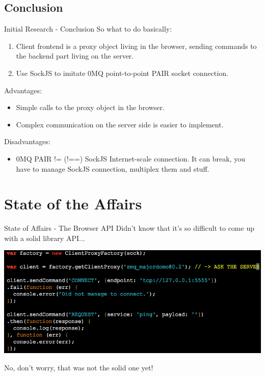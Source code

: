 \documentclass{beamer}
\begin{document}
\subsection{Conclusion}
\begin{frame}{Initial Research - Conclusion}
  So what to do basically:
  \begin{enumerate}
    \item Client frontend is a proxy object living in the browser,
	      sending commands to the backend part living on the server.
	\item Use SockJS to imitate 0MQ point-to-point PAIR socket connection.
  \end{enumerate}
  Advantages:
  \begin{itemize}
    \item Simple calls to the proxy object in the browser.
	\item Complex communication on the server side is easier to implement.
  \end{itemize}
  Disadvantages:
  \begin{itemize}
    \item 0MQ PAIR != (!==) SockJS Internet-scale connection. It can break,
	      you have to manage SockJS connection, multiplex them and stuff.
  \end{itemize}
\end{frame}

\section{State of the Affairs}
\begin{frame}{State of Affairs - The Browser API}
  Didn't know that it's so difficult to come up with a solid library API...
  \begin{center}
	\includegraphics[width=\textwidth,height=0.9\textheight,keepaspectratio]{Resources/browser-api.png}
  \end{center}
  No, don't worry, that was not the solid one yet!
\end{frame}
\end{document}
